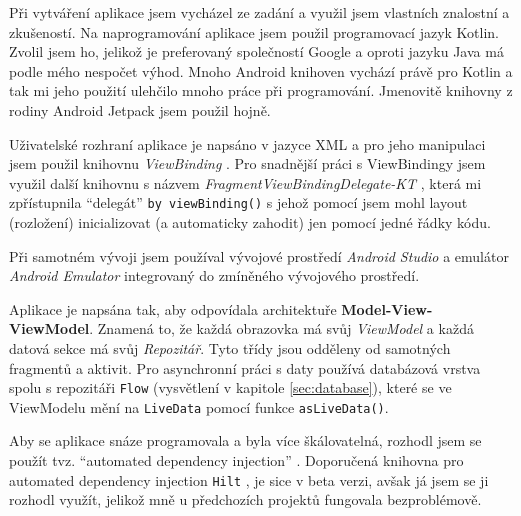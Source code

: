 \documentclass[../TakeYourPill.tex]{subfiles}
\begin{document}
Při vytváření aplikace jsem vycházel ze zadání a využil jsem vlastních znalostní a zkušeností. Na naprogramování aplikace jsem použil programovací jazyk Kotlin. Zvolil jsem ho, jelikož je preferovaný společností Google a oproti jazyku Java má podle mého nespočet výhod. Mnoho Android knihoven vychází právě pro Kotlin a tak mi jeho použití ulehčilo mnoho práce při programování. Jmenovitě knihovny z rodiny Android Jetpack \cite{jetpack} jsem použil hojně.

Uživatelské rozhraní aplikace je napsáno v jazyce XML a pro jeho manipulaci jsem použil knihovnu \textit{ViewBinding} \cite{viewbinding}. Pro snadnější práci s ViewBindingy jsem využil další knihovnu s názvem \textit{FragmentViewBindingDelegate-KT} \cite{delegate}\cite{delegate2}, která mi zpřístupnila \enquote{delegát} \texttt{by viewBinding()} s jehož pomocí jsem mohl layout (rozložení) inicializovat (a automaticky zahodit) jen pomocí jedné řádky kódu.

Při samotném vývoji jsem používal vývojové prostředí \textit{Android Studio} \cite{studio} a emulátor \textit{Android Emulator} integrovaný do zmíněného vývojového prostředí.

Aplikace je napsána tak, aby odpovídala architektuře \textbf{Model-View-ViewModel}. Znamená to, že každá obrazovka má svůj \textit{ViewModel} a každá datová sekce má svůj \textit{Repozitář}. Tyto třídy jsou odděleny od samotných fragmentů a aktivit. Pro asynchronní práci s daty používá databázová vrstva spolu s repozitáři \texttt{Flow} \cite{flow} (vysvětlení v kapitole \ref{sec:database}), které se ve ViewModelu mění na \texttt{LiveData} \cite{livedata} pomocí funkce \texttt{asLiveData()}.






Aby se aplikace snáze programovala a byla více škálovatelná, rozhodl jsem se použít tvz. \enquote{automated dependency injection} \cite{di}. Doporučená knihovna pro automated dependency injection \texttt{Hilt} \cite{hilt}, je sice v beta verzi, avšak já jsem se ji rozhodl využít, jelikož mně u předchozích projektů fungovala bezproblémově.


\end{document}

